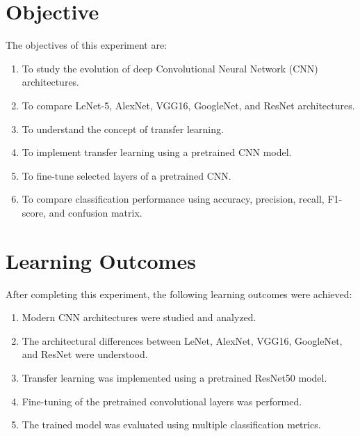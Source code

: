 \documentclass[12pt,a4paper]{article}
\begin{document}

\tableofcontents
\newpage


\section{Objective}

The objectives of this experiment are:

\begin{enumerate}
    \item To study the evolution of deep Convolutional Neural Network (CNN) architectures.
    \item To compare LeNet-5, AlexNet, VGG16, GoogleNet, and ResNet architectures.
    \item To understand the concept of transfer learning.
    \item To implement transfer learning using a pretrained CNN model.
    \item To fine-tune selected layers of a pretrained CNN.
    \item To compare classification performance using accuracy, precision, recall, F1-score, and confusion matrix.
\end{enumerate}


\section{Learning Outcomes}

After completing this experiment, the following learning outcomes were achieved:

\begin{enumerate}
    \item Modern CNN architectures were studied and analyzed.
    \item The architectural differences between LeNet, AlexNet, VGG16, GoogleNet, and ResNet were understood.
    \item Transfer learning was implemented using a pretrained ResNet50 model.
    \item Fine-tuning of the pretrained convolutional layers was performed.
    \item The trained model was evaluated using multiple classification metrics.
\end{enumerate}
\end{document}
